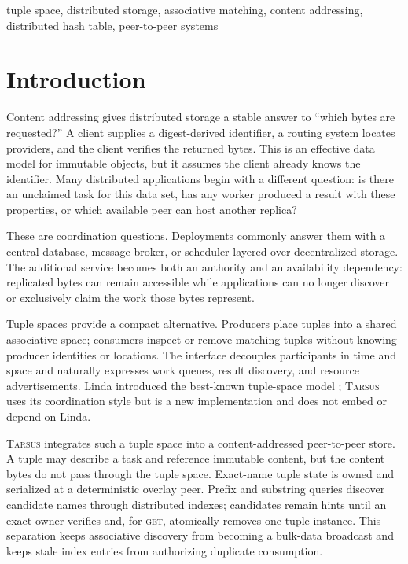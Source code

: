 \documentclass[conference]{IEEEtran}
\newcommand{\system}{\textsc{Tarsus}\xspace}
\newcommand{\getop}{\textsc{get}\xspace}
\begin{document}
\begin{IEEEkeywords}
tuple space, distributed storage, associative matching, content addressing,
distributed hash table, peer-to-peer systems
\end{IEEEkeywords}

\section{Introduction}

Content addressing gives distributed storage a stable answer to ``which bytes
are requested?'' A client supplies a digest-derived identifier, a routing
system locates providers, and the client verifies the returned bytes. This is
an effective data model for immutable objects, but it assumes the client
already knows the identifier. Many distributed applications begin with a
different question: is there an unclaimed task for this data set, has any
worker produced a result with these properties, or which available peer can
host another replica?

These are coordination questions. Deployments commonly answer them with a
central database, message broker, or scheduler layered over decentralized
storage. The additional service becomes both an authority and an availability
dependency: replicated bytes can remain accessible while applications can no
longer discover or exclusively claim the work those bytes represent.

Tuple spaces provide a compact alternative. Producers place tuples into a
shared associative space; consumers inspect or remove matching tuples without
knowing producer identities or locations. The interface decouples participants
in time and space and naturally expresses work queues, result discovery, and
resource advertisements. Linda introduced the best-known tuple-space model
\cite{Gelernter1985,CarrieroGelernter1989}; \system uses its coordination style
but is a new implementation and does not embed or depend on Linda.

\system integrates such a tuple space into a content-addressed peer-to-peer
store. A tuple may describe a task and reference immutable content, but the
content bytes do not pass through the tuple space. Exact-name tuple state is
owned and serialized at a deterministic overlay peer. Prefix and substring
queries discover candidate names through distributed indexes; candidates
remain hints until an exact owner verifies and, for \getop, atomically removes
one tuple instance. This separation keeps associative discovery from becoming
a bulk-data broadcast and keeps stale index entries from authorizing duplicate
consumption.
\end{document}
